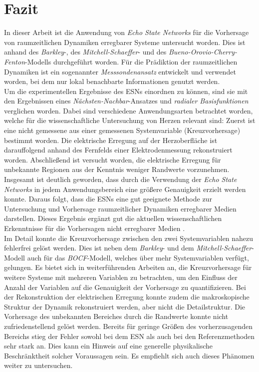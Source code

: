 \chapter{Fazit}
In dieser Arbeit ist die Anwendung von \textit{Echo State Networks} für die Vorhersage von raumzeitlichen Dynamiken erregbarer Systeme untersucht worden. Dies ist anhand des \textit{Barkley}-, des \textit{Mitchell-Schaeffer}- und des \textit{Bueno-Orovio-Cherry-Fenton}-Modells durchgeführt worden. Für die Prädiktion der raumzeitlichen Dynamiken ist ein sogenannter \textit{Messsondenansatz} entwickelt und verwendet worden, bei dem nur lokal benachbarte Informationen genutzt werden.\\

Um die experimentellen Ergebnisse des \textsc{ESN}s einordnen zu können, sind sie mit den Ergebnissen eines \textit{Nächsten-Nachbar}-Ansatzes und \textit{radialer Basisfunktionen} verglichen worden. Dabei sind verschiedene Anwendungsarten betrachtet worden, welche für die wissenschaftliche Untersuchung von Herzen relevant sind: Zuerst ist eine nicht gemessene aus einer gemessenen Systemvariable (Kreuzvorhersage) bestimmt worden. Die elektrische Erregung auf der Herzoberfläche ist darauffolgend anhand des Fernfelds einer Elektrodenmessung rekonstruiert worden. Abschließend ist versucht worden, die elektrische Erregung für unbekannte Regionen aus der Kenntnis weniger Randwerte vorzunehmen.\\

Insgesamt ist deutlich geworden, dass durch die Verwendung der \textit{Echo State Networks} in jedem Anwendungsbereich eine größere Genauigkeit erzielt werden konnte. Daraus folgt, dass die \textsc{ESN}s eine gut geeignete Methode zur Untersuchung und Vorhersage raumzeitlicher Dynamiken erregbarer Medien darstellen. Dieses Ergebnis ergänzt gut die aktuellen wissenschaftlichen Erkenntnisse für die Vorhersagen nicht erregbarer Medien \citep{Lu2017}.\\

Im Detail konnte die Kreuzvorhersage zwischen den zwei Systemvariablen nahezu fehlerfrei gelöst werden. Dies ist neben dem \textit{Barkley}- und dem \textit{Mitchell-Schaeffer}-Modell auch für das \textit{BOCF}-Modell, welches über mehr Systemvariablen verfügt, gelungen. Es bietet sich in weiterführenden Arbeiten an, die Kreuzvorhersage für weitere Systeme mit mehreren Variablen zu betrachten, um den Einfluss der Anzahl der Variablen auf die Genauigkeit der Vorhersage zu quantifizieren. Bei der Rekonstruktion der elektrischen Erregung konnte zudem die makroskopische Struktur der Dynamik rekonstruiert werden, aber nicht die Detailstruktur. Die Vorhersage des unbekannten Bereiches durch die Randwerte konnte nicht zufriedenstellend gelöst werden. Bereits für geringe Größen des vorherzusagenden Bereichs stieg der Fehler sowohl bei dem \textsc{ESN} als auch bei den Referenzmethoden sehr stark an. Dies kann ein Hinweis auf eine generelle physikalische Beschränktheit solcher Voraussagen sein. Es empfiehlt sich auch dieses Phänomen weiter zu untersuchen. \\

